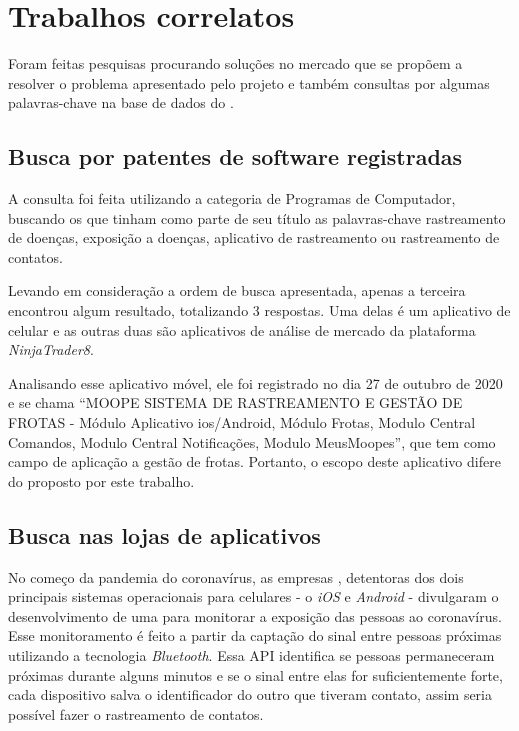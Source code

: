 \chapter{Trabalhos correlatos}\label{chp:correlatos}

Foram feitas pesquisas procurando soluções no mercado que se propõem a resolver o problema apresentado pelo projeto e também consultas por algumas palavras-chave na base de dados do .

\section{Busca por patentes de software registradas}\label{sec:inpi}
A consulta foi feita utilizando a categoria de Programas de Computador, buscando os que tinham como parte de seu título as palavras-chave rastreamento de doenças, exposição a doenças, aplicativo de rastreamento ou rastreamento de contatos.

Levando em consideração a ordem de busca apresentada, apenas a terceira encontrou algum resultado, totalizando 3 respostas. Uma delas é um aplicativo de celular e as outras duas são aplicativos de análise de mercado da plataforma \textit{NinjaTrader8}.

Analisando esse aplicativo móvel, ele foi registrado no dia 27 de outubro de 2020 e se chama “MOOPE SISTEMA DE RASTREAMENTO E GESTÃO DE FROTAS - Módulo Aplicativo ios/Android, Módulo Frotas, Modulo Central Comandos, Modulo Central Notificações, Modulo MeusMoopes”, que tem como campo de aplicação a gestão de frotas. Portanto, o escopo deste aplicativo difere do proposto por este trabalho.

\section{Busca nas lojas de aplicativos}\label{sec:mercado}
No começo da pandemia do coronavírus, as empresas \textcite{GoogleApple2020}, detentoras dos dois principais sistemas operacionais para celulares - o \textit{iOS} e \textit{Android} - divulgaram o desenvolvimento de uma  para monitorar a exposição das pessoas ao coronavírus. Esse monitoramento é feito a partir da captação do sinal entre pessoas próximas utilizando a tecnologia \textit{Bluetooth}. Essa API identifica se pessoas permaneceram próximas durante alguns minutos e se o sinal entre elas for suficientemente forte, cada dispositivo salva o identificador do outro que tiveram contato, assim seria possível fazer o rastreamento de contatos.

